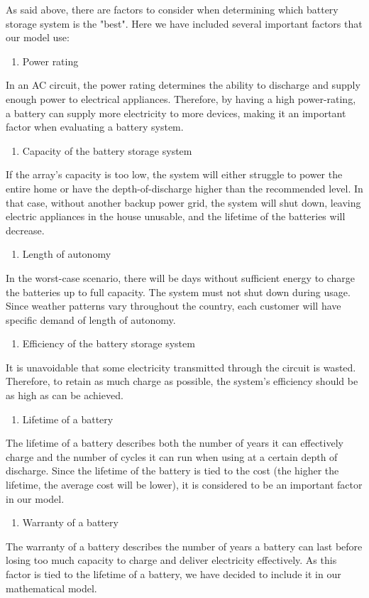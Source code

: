 As said above, there are factors to consider when determining which battery storage system is the "best". Here we have included several important factors that our model use:
\begin{enumerate}
    \item Power rating
\end{enumerate}
In an AC circuit, the power rating determines the ability to discharge and supply enough power to electrical appliances. Therefore, by having a high power-rating, a battery can supply more electricity to more devices, making it an important factor when evaluating a battery system.
\begin{enumerate}[resume]
    \item Capacity of the battery storage system
\end{enumerate}
If the array's capacity is too low, the system will either struggle to power the entire home or have the depth-of-discharge higher than the recommended level. In that case, without another backup power grid, the system will shut down, leaving electric appliances in the house unusable, and the lifetime of the batteries will decrease.
\begin{enumerate}[resume]
    \item Length of autonomy
\end{enumerate}
In the worst-case scenario, there will be days without sufficient energy to charge the batteries up to full capacity. The system must not shut down during usage. Since weather patterns vary throughout the country, each customer will have specific demand of length of autonomy.
\begin{enumerate}[resume]
    \item Efficiency of the battery storage system
\end{enumerate}
It is unavoidable that some electricity transmitted through the circuit is wasted. Therefore, to retain as much charge as possible, the system's efficiency should be as high as can be achieved.
\begin{enumerate}[resume]
    \item Lifetime of a battery
\end{enumerate}
The lifetime of a battery describes both the number of years it can effectively charge and the number of cycles it can run when using at a certain depth of discharge. Since the lifetime of the battery is tied to the cost (the higher the lifetime, the average cost will be lower), it is considered to be an important factor in our model.
\begin{enumerate}[resume]
    \item Warranty of a battery
\end{enumerate}
The warranty of a battery describes the number of years a battery can last before losing too much capacity to charge and deliver electricity effectively. As this factor is tied to the lifetime of a battery, we have decided to include it in our mathematical model.